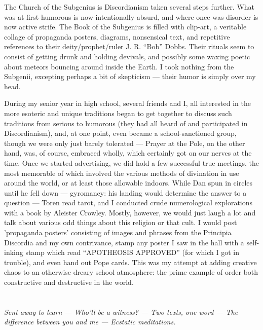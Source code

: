 \documentclass{book}
\begin{document}
The Church of the Subgenius is Discordianism taken several steps further.  What was at first humorous is now intentionally absurd, and where once was disorder is now active strife.  The Book of the Subgenius is filled with clip-art, a veritable collage of propaganda posters, diagrams, nonsensical text, and repetitive references to their deity/prophet/ruler J.  R.  ``Bob'' Dobbs.  Their rituals seem to consist of getting drunk and holding devivals, and possibly some waxing poetic about meteors bouncing around inside the Earth.  I took nothing from the Subgenii, excepting perhaps a bit of skepticism --- their humor is simply over my head.

During my senior year in high school, several friends and I, all interested in the more esoteric and unique traditions began to get together to discuss such traditions from serious to humorous (they had all heard of and participated in Discordianism), and, at one point, even became a school-sanctioned group, though we were only just barely tolerated --- Prayer at the Pole, on the other hand, was, of course, embraced wholly, which certainly got on our nerves at the time.  Once we started advertising, we did hold a few successful true meetings, the most memorable of which involved the various methods of divination in use around the world, or at least those allowable indoors.  While Dan spun in circles until he fell down --- gyromancy: his landing would determine the answer to a question --- Toren read tarot, and I conducted crude numerological explorations with a book by Aleister Crowley.  Mostly, however, we would just laugh a lot and talk about various odd things about this religion or that cult.  I would post 'propaganda posters' consisting of images and phrases from the Principia Discordia and my own contrivance, stamp any poster I saw in the hall with a self-inking stamp which read ``APOTHEOSIS APPROVED'' (for which I got in trouble), and even hand out Pope cards.  This was my attempt at adding creative chaos to an otherwise dreary school atmosphere: the prime example of order both constructive and destructive in the world.

\chapter{}
\begin{center}
	\emph{Sent away to learn --- Who'll be a witness? --- Two texts, one word --- The difference between you and me --- Ecstatic meditations.}
\end{center}
\end{document}
